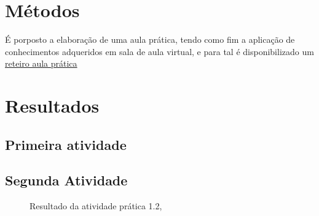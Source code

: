 \section{Métodos}

\par É porposto a elaboração de uma aula prática, tendo como fim a aplicação de conhecimentos adqueridos em sala de aula virtual, e para tal é disponibilizado um \href{https://github.com/ENGENHARIA-DE-SOFTWARE-UNOPAR/NoSQL/blob/main/Roteiro-aula%20pratica.pdf}{reteiro aula prática}



\section{Resultados}
\subsection{Primeira atividade}\label{1atividade}

\subsection{Segunda Atividade}\label{2atividae}



\begin{figure}[H] %
  \center
  \caption{Resultado da atividade prática 1.2, \cite{oliveira_SO2009}}\label{fig:ap1_cod_vigual1}
\end{figure}


